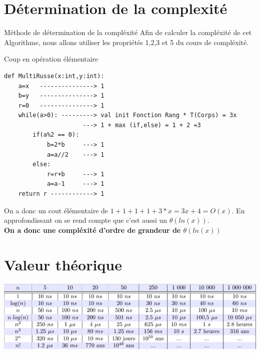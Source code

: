 \documentclass[12pt,a4paper]{report}
\begin{document}
\section{Détermination de la complexité}
\begin{mybox}{Méthode de détermination de la compléxité}
Afin de calculer la compléxité de cet Algorithme, nous allons utiliser les propriétés 1,2,3 et 5 du cours de compléxité.
\end{mybox}
\begin{Cas1}{Coup en opération élémentaire}
 \begin{lstlisting}
def MultiRusse(x:int,y:int):
    a=x   ---------------> 1
    b=y   ---------------> 1
    r=0   ---------------> 1
    while(a>0): ---------> val init Fonction Rang * T(Corps) = 3x
    	              ---> 1 + max (if,else) = 1 + 2 =3
    	if(a%2 == 0): 
            b=2*b     ---> 1
            a=a//2    ---> 1
        else:
            r=r+b     ---> 1
            a=a-1     ---> 1
    return r ------------> 1
\end{lstlisting}
\end{Cas1}
\begin{flushleft}
On a donc un cout élémentaire de $1+1+1+1+3*x=3x+4=O(x)$. En approfondissant on se rend compte que c'est aussi un $\theta(ln(x))$.\\
\textbf{On a donc une compléxité d'ordre de grandeur de $\theta(ln(x))$}
\end{flushleft}
\section{Valeur théorique}
\includegraphics[scale=1]{TableauThéorique}
\end{document}
